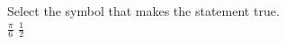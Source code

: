 \documentclass{ximera}
\author{David Kish}
\begin{document}
\begin{exercise}
Select the symbol that makes the statement true.\\
$\frac{\pi}{6}$ \wordChoice{\choice{$<$}\choice[correct]{$>$}\choice{$=$}} $\frac{1}{2}$ 

\end{exercise}
\end{document}

